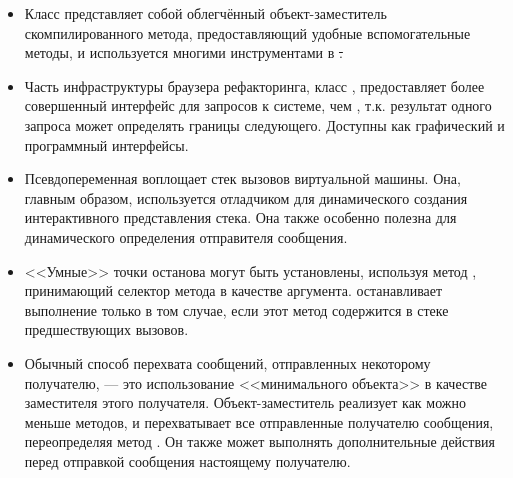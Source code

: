\documentclass[a4paper,10pt,twoside]{book}
\begin{document}
{\begin{itemize}
\item Класс  представляет собой облегчённый объект-заместитель скомпилированного метода, предоставляющий удобные вспомогательные методы, и используется многими инструментами в \st.
\item Часть инфраструктуры браузера рефакторинга, класс , предоставляет более совершенный интерфейс для запросов к системе, чем , т.к. результат одного запроса может определять границы следующего. Доступны как графический и программный интерфейсы.
\item Псевдопеременная  воплощает стек вызовов виртуальной машины. Она, главным образом, используется отладчиком для динамического создания интерактивного представления стека. Она также особенно полезна для динамического определения отправителя сообщения.
\item <<Умные>> точки останова могут быть установлены, используя метод , принимающий селектор метода в качестве аргумента.  останавливает выполнение только в том случае, если этот метод содержится в стеке предшествующих вызовов.
\item Обычный способ перехвата сообщений, отправленных некоторому получателю, --- это использование <<минимального объекта>> в качестве заместителя этого получателя. Объект-заместитель реализует как можно меньше методов, и перехватывает все отправленные получателю сообщения, переопределяя метод . Он также может выполнять дополнительные действия перед отправкой сообщения настоящему получателю.

\end{itemize}}
\end{document}
